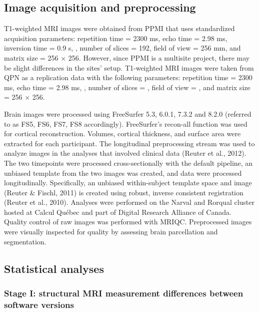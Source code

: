 \documentclass[11pt]{article}
\begin{document}
\subsection{Image acquisition and preprocessing}

T1-weighted MRI images were obtained from PPMI that uses standardized acquisition parameters: repetition time =
2300 ms, echo time = 2.98 ms, inversion time = 0.9 s, , number of slices = 192,
field of view = 256 mm, and matrix size = 256 $\times$ 256. However, since PPMI is a multisite project, there may be
slight differences in the sites' setup. T1-weighted MRI images were taken from QPN as a replication data with the
following parameters: repetition time = 2300 ms, echo time = 2.98 ms, , number of slices = , field of view = \rev{256 mm}, and matrix size = 256 $\times$ 256.

Brain images were processed using FreeSurfer 5.3, 6.0.1, 7.3.2 and 8.2.0 (referred to as FS5, FS6, FS7, FS8
accordingly). FreeSurfer's recon-all function was used for cortical reconstruction. Volumes, cortical thickness,
and surface area were extracted for each participant. The longitudinal preprocessing stream was used to analyze
images in the analyses that involved clinical data (Reuter et al., 2012). The two timepoints were processed
cross-sectionally with the default pipeline, an unbiased template from the two images was created, and data were
processed longitudinally. Specifically, an unbiased within-subject template space and image (Reuter \& Fischl,
2011) is created using robust, inverse consistent registration (Reuter et al., 2010). Analyses were performed on
the Narval and Rorqual cluster hosted at Calcul Québec and part of Digital Research Alliance of Canada.
Quality control of raw images was performed with MRIQC. Preprocessed images were visually
inspected for quality by assessing brain parcellation and segmentation.

\subsection{Statistical analyses}

\subsubsection*{Stage I: structural MRI measurement differences between software versions}
\end{document}
